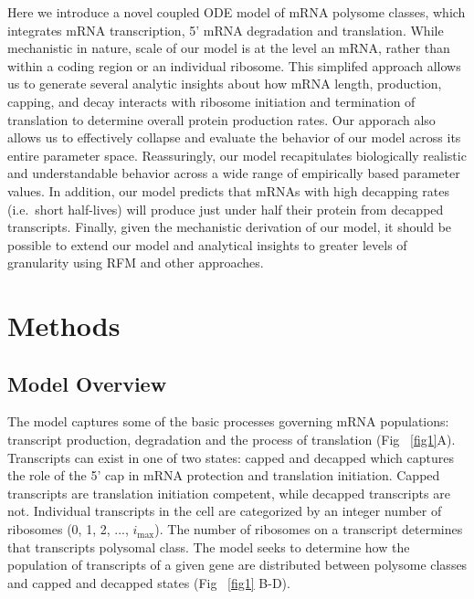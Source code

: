 \documentclass[10pt,letterpaper]{article}
\newcommand{\imax}{\ensuremath{{i_{\max}}}\xspace}
\begin{document}
Here we introduce a novel coupled ODE model of mRNA polysome classes, which integrates mRNA transcription, 5' mRNA degradation and translation.
While mechanistic in nature,  scale of our model is at the level an mRNA, rather than within a coding region or an individual ribosome.
This simplifed approach allows us to generate several analytic insights about how mRNA length, production, capping, and decay interacts with  ribosome initiation and termination of translation to determine overall protein production rates.
Our apporach also allows us to effectively collapse and evaluate the behavior of our model across its entire parameter space.
Reassuringly, our model recapitulates biologically realistic and understandable behavior across a wide range of empirically based parameter values.
In addition, our model predicts that mRNAs with high decapping rates (i.e.~short half-lives) will produce just under half their protein from decapped transcripts.
Finally, given the mechanistic derivation of our model, it should be possible to extend our model and analytical insights to greater levels of granularity using RFM and other approaches.

\section*{Methods}\label{sec:description}
\subsection*{Model Overview}

The model captures some of the basic processes governing mRNA populations: transcript production, degradation and the process of translation (Fig ~\ref{fig1}A).
Transcripts can exist in one of two states: capped and decapped which captures the role of the 5' cap in mRNA protection and translation initiation. 
Capped transcripts are translation initiation competent, while decapped transcripts are not.
Individual transcripts in the cell are categorized by an integer number of ribosomes (0, 1, 2, ..., \imax).
The number of ribosomes on a transcript determines that transcripts polysomal class.
The model seeks to determine how the population of transcripts of a given gene are distributed between polysome classes and capped and decapped states (Fig ~\ref{fig1} B-D).
\end{document}
